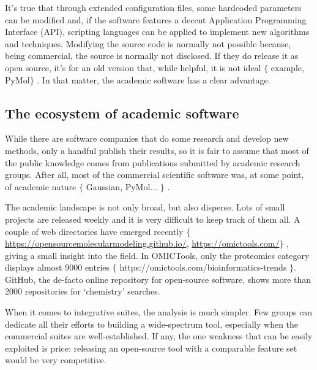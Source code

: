 It’s true that through extended configuration files, some hardcoded parameters can be modified and, if the software features a decent Application Programming Interface (API), scripting languages can be applied to implement new algorithms and techniques. Modifying the source code is normally not possible because, being commercial, the source is normally not disclosed. If they do release it as open source, it’s for an old version that, while helpful, it is not ideal $ \{ $ example, PyMol$ \} $ . In that matter, the academic software has a clear advantage.

\subsection{The ecosystem of academic software}
While there are software companies that do some research and develop new methods, only a handful publish their results, so it is fair to assume that most of the public knowledge comes from publications submitted by academic research groups. After all, most of the commercial scientific software was, at some point, of academic nature $ \{ $ Gaussian, PyMol$ \ldots $ $ \} $ .

The academic landscape is not only broad, but also disperse. Lots of small projects are released weekly and it is very difficult to keep track of them all. A couple of web directories have emerged recently $ \{ $ \href{https://opensourcemolecularmodeling.github.io/}{https://opensourcemolecularmodeling.github.io/}, \href{https://omictools.com/}{https://omictools.com/}$ \} $ , giving a small insight into the field. In OMICTools, only the proteomics category displays almost 9000 entries $ \{ $ https://omictools.com/bioinformatics-trends $ \} $. GitHub,\cite{github} the de-facto online repository for open-source software, shows more than 2000 repositories for ‘chemistry’ searches.

When it comes to integrative suites, the analysis is much simpler. Few groups can dedicate all their efforts to building a wide-spectrum tool, especially when the commercial suites are well-established. If any, the one weakness that can be easily exploited is price: releasing an open-source tool with a comparable feature set would be very competitive.

